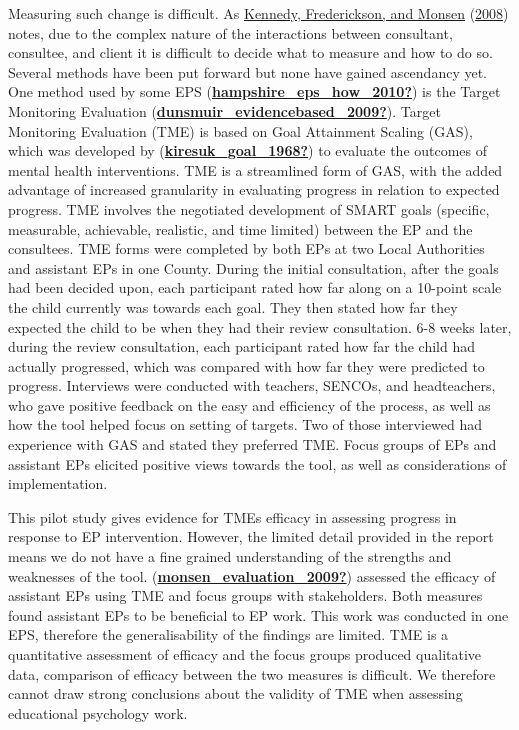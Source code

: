 \documentclass[
]{article}
\begin{document}
Measuring such change is difficult. As
\protect\hyperlink{ref-kennedyEducationalPsychologistsWalk2008}{Kennedy,
Frederickson, and Monsen}
(\protect\hyperlink{ref-kennedyEducationalPsychologistsWalk2008}{2008})
notes, due to the complex nature of the interactions between consultant,
consultee, and client it is difficult to decide what to measure and how
to do so. Several methods have been put forward but none have gained
ascendancy yet. One method used by some EPS
(\protect\hyperlink{ref-hampshire_eps_how_2010}{\textbf{hampshire\_eps\_how\_2010?}})
is the Target Monitoring Evaluation
(\protect\hyperlink{ref-dunsmuir_evidencebased_2009}{\textbf{dunsmuir\_evidencebased\_2009?}}).
Target Monitoring Evaluation (TME) is based on Goal Attainment Scaling
(GAS), which was developed by
(\protect\hyperlink{ref-kiresuk_goal_1968}{\textbf{kiresuk\_goal\_1968?}})
to evaluate the outcomes of mental health interventions. TME is a
streamlined form of GAS, with the added advantage of increased
granularity in evaluating progress in relation to expected progress. TME
involves the negotiated development of SMART goals (specific,
measurable, achievable, realistic, and time limited) between the EP and
the consultees. TME forms were completed by both EPs at two Local
Authorities and assistant EPs in one County. During the initial
consultation, after the goals had been decided upon, each participant
rated how far along on a 10-point scale the child currently was towards
each goal. They then stated how far they expected the child to be when
they had their review consultation. 6-8 weeks later, during the review
consultation, each participant rated how far the child had actually
progressed, which was compared with how far they were predicted to
progress. Interviews were conducted with teachers, SENCOs, and
headteachers, who gave positive feedback on the easy and efficiency of
the process, as well as how the tool helped focus on setting of targets.
Two of those interviewed had experience with GAS and stated they
preferred TME. Focus groups of EPs and assistant EPs elicited positive
views towards the tool, as well as considerations of implementation.

This pilot study gives evidence for TMEs efficacy in assessing progress
in response to EP intervention. However, the limited detail provided in
the report means we do not have a fine grained understanding of the
strengths and weaknesses of the tool.
(\protect\hyperlink{ref-monsen_evaluation_2009}{\textbf{monsen\_evaluation\_2009?}})
assessed the efficacy of assistant EPs using TME and focus groups with
stakeholders. Both measures found assistant EPs to be beneficial to EP
work. This work was conducted in one EPS, therefore the generalisability
of the findings are limited. TME is a quantitative assessment of
efficacy and the focus groups produced qualitative data, comparison of
efficacy between the two measures is difficult. We therefore cannot draw
strong conclusions about the validity of TME when assessing educational
psychology work.
\end{document}
